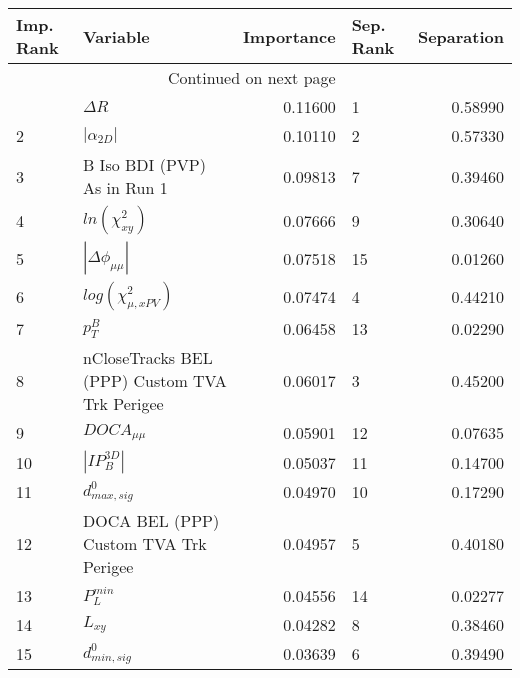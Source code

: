 \usepackage{lscape}

\begin{landscape}
\begin{longtable}{llrlr}
\toprule
Imp. Rank &                                       Variable &  Importance & Sep. Rank &  Separation \\
\midrule
\endhead
\midrule
\multicolumn{3}{r}{{Continued on next page}} \\
\midrule
\endfoot

\bottomrule
\endlastfoot
        1 &                                     $\Delta R$ &     0.11600 &         1 &     0.58990 \\
        2 &                                $|\alpha_{2D}|$ &     0.10110 &         2 &     0.57330 \\
        3 &                    B Iso BDI (PVP) As in Run 1 &     0.09813 &         7 &     0.39460 \\
        4 &                            $ln(\chi^{2}_{xy})$ &     0.07666 &         9 &     0.30640 \\
        5 &                       $|\Delta \phi_{\mu\mu}|$ &     0.07518 &        15 &     0.01260 \\
        6 &                      $log(\chi^{2}_{\mu,xPV})$ &     0.07474 &         4 &     0.44210 \\
        7 &                                      $p^B_{T}$ &     0.06458 &        13 &     0.02290 \\
        8 &  nCloseTracks BEL (PPP) Custom TVA Trk Perigee &     0.06017 &         3 &     0.45200 \\
        9 &                                $DOCA_{\mu\mu}$ &     0.05901 &        12 &     0.07635 \\
       10 &                                $|IP_{B}^{3D}|$ &     0.05037 &        11 &     0.14700 \\
       11 &                               $d^0_{max, sig}$ &     0.04970 &        10 &     0.17290 \\
       12 &          DOCA BEL (PPP) Custom TVA Trk Perigee &     0.04957 &         5 &     0.40180 \\
       13 &                                  $P^{min}_{L}$ &     0.04556 &        14 &     0.02277 \\
       14 &                                       $L_{xy}$ &     0.04282 &         8 &     0.38460 \\
       15 &                               $d^0_{min, sig}$ &     0.03639 &         6 &     0.39490 \\
\end{longtable}

\end{landscape}

